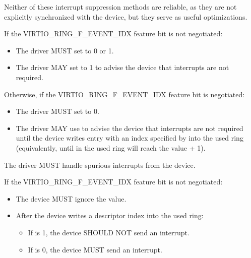 Neither of these interrupt suppression methods are reliable, as they
are not explicitly synchronized with the device, but they serve as
useful optimizations.

If the VIRTIO_RING_F_EVENT_IDX feature bit is not negotiated:
\begin{itemize}
\item The driver MUST set  to 0 or 1.
\item The driver MAY set  to 1 to advise
the device that interrupts are not required.
\end{itemize}

Otherwise, if the VIRTIO_RING_F_EVENT_IDX feature bit is negotiated:
\begin{itemize}
\item The driver MUST set  to 0.
\item The driver MAY use  to advise the device that interrupts are not required until the device writes entry with an index specified by  into the used ring (equivalently, until  in the
used ring will reach the value  + 1).
\end{itemize}

The driver MUST handle spurious interrupts from the device.


If the VIRTIO_RING_F_EVENT_IDX feature bit is not negotiated:
\begin{itemize}
\item The device MUST ignore the  value.
\item After the device writes a descriptor index into the used ring:
  \begin{itemize}
  \item If  is 1, the device SHOULD NOT send an interrupt.
  \item If  is 0, the device MUST send an interrupt.
  \end{itemize}
\end{itemize}

